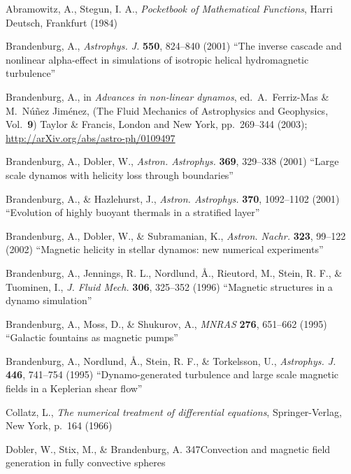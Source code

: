 \documentclass[\mydriver,12pt,twoside,notitlepage,a4paper]{article}
\begin{document}
 

\begin{thebibliography}{99}

 Abramowitz, A., Stegun, I. A.,
  \emph{Pocketbook of Mathematical Functions\/},
  Harri Deutsch, Frankfurt (1984)

 Brandenburg, A.,
  \emph{Astrophys. J.} \textbf{550}, 824--840 (2001)
  ``The inverse cascade and nonlinear alpha-effect in simulations
  of isotropic helical hydromagnetic turbulence''

 Brandenburg, A., in \emph{Advances in non-linear dynamos},
  ed.\ A.\ Ferriz-Mas \& M.\ N\'u\~nez Jim\'enez,
  (The Fluid Mechanics of Astrophysics and Geophysics, Vol.\ {\bf9})
  Taylor \& Francis, London and New York, pp.~269--344 (2003);
  \url{http://arXiv.org/abs/astro-ph/0109497}

 Brandenburg, A., Dobler, W.,
  \emph{Astron. Astrophys.} \textbf{369}, 329--338 (2001)
  ``Large scale dynamos with helicity loss through boundaries''

 Brandenburg, A., \& Hazlehurst, J.,
  \emph{Astron. Astrophys.} \textbf{370}, 1092--1102 (2001)
  ``Evolution of highly buoyant thermals in a stratified layer''

Brandenburg, A., Dobler, W., \& Subramanian, K.,
  \emph{Astron. Nachr.} \textbf{323}, 99--122 (2002)
  ``Magnetic helicity in stellar dynamos: new numerical experiments''

 Brandenburg, A., Jennings, R. L., Nordlund, \AA.,
  Rieutord, M., Stein, R. F., \& Tuominen, I.,
  \emph{J. Fluid Mech.} \textbf{306}, 325--352 (1996)
  ``Magnetic structures in a dynamo simulation''

Brandenburg, A., Moss, D., \& Shukurov, A.,
  \emph{MNRAS} \textbf{276}, 651--662 (1995)
  ``Galactic fountains as magnetic pumps''

 Brandenburg, A., Nordlund, \AA., Stein, R. F.,
  \& Torkelsson, U.,
  \emph{Astrophys. J.} \textbf{446}, 741--754 (1995)
  ``Dynamo-generated turbulence and large scale magnetic fields
  in a Keplerian shear flow''

Collatz, L.,
  \emph{The numerical treatment of differential equations},
  Springer-Verlag, New York, p.\ 164 (1966)

  Dobler, W., Stix, M., \& Brandenburg, A.
  {347}{Convection and magnetic field generation in fully convective spheres}


\end{thebibliography}
\end{document}
